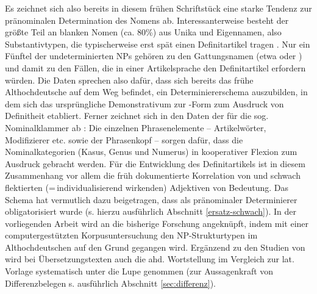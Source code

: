 Es zeichnet sich also bereits in diesem frühen Schriftstück eine starke Tendenz zur pränominalen Determination des Nomens ab. Interessanterweise besteht der größte Teil an blanken Nomen (ca. 80\%) aus Unika und Eigennamen, also Substantivtypen, die typischerweise erst spät einen Definitartikel tragen \parencite[s. z.B.][]{Schmuck2014}. Nur ein Fünftel der undeterminierten NPs gehören zu den Gattungsnamen (etwa  oder ) und damit zu den Fällen, die in einer Artikelsprache den Definitartikel erfordern würden. Die Daten sprechen also dafür, dass sich bereits das frühe Althochdeutsche auf dem Weg befindet, ein Determiniererschema auszubilden, in dem sich das ursprüngliche Demonstrativum  zur -Form zum Ausdruck von Definitheit etabliert.  Ferner zeichnet sich in den Daten der  für die sog. Nominalklammer ab \parencite[vgl. u.a.][ ]{Ronneberger-Sibold1994,Ronneberger-Sibold2010,Ronneberger-Sibold2010a,Szczepaniak2011a,Flick2018}: Die einzelnen Phrasenelemente -- Artikelwörter,  Modifizierer etc. sowie der Phrasenkopf -- sorgen dafür, dass die Nominalkategorien (Kasus, Genus und Numerus) in kooperativer Flexion zum Ausdruck gebracht werden. Für die Entwicklung des Definitartikels ist in diesem Zusammenhang vor allem die früh dokumentierte Korrelation von  und schwach flektierten (=\,individualisierend wirkenden) Adjektiven von Bedeutung. Das Schema hat vermutlich dazu beigetragen, dass   als pränominaler Determinierer obligatorisiert wurde (s. hierzu ausführlich Abschnitt \ref{ersatz-schwach}).  In der vorliegenden Arbeit wird an die bisherige Forschung angeknüpft, indem  mit einer computergestützten Korpusuntersuchung den NP-Strukturtypen im Althochdeutschen auf den Grund gegangen wird. Ergänzend zu den Studien von \textcite{Oubouzar1989,Oubouzar1992} wird bei Übersetzungstexten auch die ahd. Wortstellung im Vergleich zur lat. Vorlage systematisch unter die Lupe genommen (zur Aussagenkraft von Differenzbelegen s. ausführlich Abschnitt \ref{sec:differenz}).   



